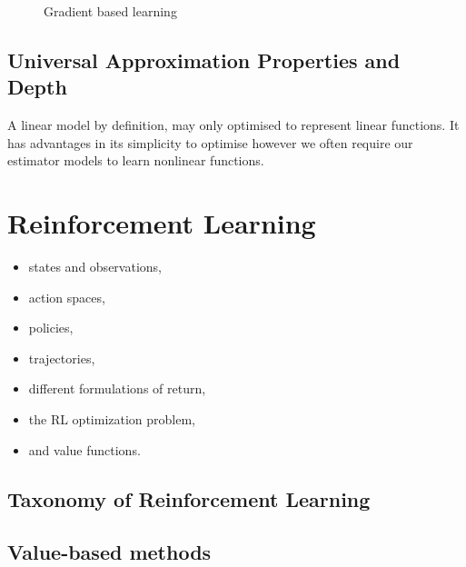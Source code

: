 \begin{figure}[htp]
    \centering
    
    \caption{Gradient based learning}
    \label{fig:gradient-descent}
\end{figure}

\subsection{Universal Approximation Properties and Depth}

A linear model by definition, may only optimised to represent linear functions.
It has advantages in its simplicity to optimise however we often require our
estimator models to learn nonlinear functions.


\newpage{}
\section{Reinforcement Learning\label{ssec:RL}}



\begin{itemize}
    \item states and observations,
    \item action spaces,
    \item policies,
    \item trajectories,
    \item different formulations of return,
    \item the RL optimization problem,
    \item and value functions.
\end{itemize}

\subsection{Taxonomy of Reinforcement Learning}

\subsection{Value-based methods}

